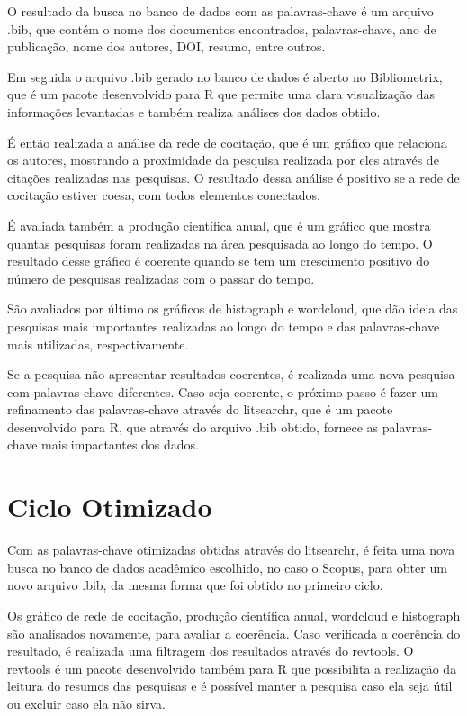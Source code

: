 O resultado da busca no banco de dados com as palavras-chave é um arquivo .bib, que contém o nome dos documentos encontrados, palavras-chave, ano de publicação, nome dos autores, DOI, resumo, entre outros.

Em seguida o arquivo .bib gerado no banco de dados é aberto no Bibliometrix, que é um pacote desenvolvido para R que permite uma clara visualização das informações levantadas e também realiza análises dos dados obtido. 

É então realizada a análise da rede de cocitação, que é um gráfico que relaciona os autores, mostrando a proximidade da pesquisa realizada por eles através de citações realizadas nas pesquisas. O resultado dessa análise é positivo se a rede de cocitação estiver coesa, com todos elementos conectados.

É avaliada também a produção científica anual, que é um gráfico que mostra quantas pesquisas foram realizadas na área pesquisada ao longo do tempo. O resultado desse gráfico é coerente quando se tem um crescimento positivo do número de pesquisas realizadas com o passar do tempo.

São avaliados por último os gráficos de histograph e wordcloud, que dão ideia das pesquisas mais importantes realizadas ao longo do tempo e das palavras-chave mais utilizadas, respectivamente.

Se a pesquisa não apresentar resultados coerentes, é realizada uma nova pesquisa com palavras-chave diferentes. Caso seja coerente, o próximo passo é fazer um refinamento das palavras-chave através do litsearchr, que é um pacote desenvolvido para R, que através do arquivo .bib obtido, fornece as palavras-chave mais impactantes dos dados.

\section{Ciclo Otimizado}
Com as palavras-chave otimizadas obtidas através do litsearchr, é feita uma nova busca no banco de dados acadêmico escolhido, no caso o Scopus, para obter um novo arquivo .bib, da mesma forma que foi obtido no primeiro ciclo.

Os gráfico de rede de cocitação, produção científica anual, wordcloud e histograph são analisados novamente, para avaliar a coerência. Caso verificada a coerência do resultado, é realizada uma filtragem dos resultados através do revtools. O revtools é um pacote desenvolvido também para R que possibilita a realização da leitura do resumos das pesquisas e é possível manter a pesquisa caso ela seja útil ou excluir caso ela não sirva.

